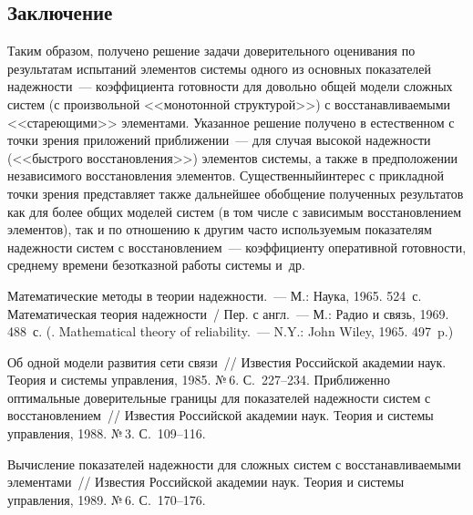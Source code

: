 \begin{multicols}{2}
\section{Заключение}

      Таким образом, получено решение задачи доверительного оценивания 
по результатам испытаний элементов системы одного из основных 
показателей надежности~--- коэффициента готовности для довольно общей 
модели сложных систем (с произвольной <<монотонной структурой>>) с 
восстанавливаемыми <<стареющими>> элементами. Указанное решение 
получено в естественном с точки зрения приложений приближении~--- для 
случая высокой надежности (<<быстрого восстановления>>) элементов 
системы, а также в предположении независимого восстановления элементов. 
Существенный\linebreak интерес с прикладной точки зрения представляет также 
дальнейшее обобщение полученных результатов как для более общих 
моделей систем (в том чис\-ле с зависимым восстановлением элементов), так и 
по отношению к другим часто используемым показателям надежности 
систем с восстановлением~--- коэффициенту оперативной готовности, 
среднему времени безотказной работы системы и~др.

{\small\frenchspacing
{%
\begin{thebibliography}{99}

 Математические 
методы в теории надежности.~--- М.: Наука, 1965. 524~с. 
 Математическая теория надежности~/ Пер. с 
англ.~--- М.: Радио и связь, 1969. 488~с. (. 
{Mathematical theory of reliability}.~--- N.Y.: John Wiley, 1965. 497~p.)

 Об одной модели развития сети связи~// Известия 
Российской академии наук. Теория и системы управления, 1985. №\,6. 
С.~227--234.
 Приближенно оптимальные доверительные границы 
для показателей надежности сис\-тем с восстановлением~// Известия 
Российской академии наук. Теория и системы управления, 1988. №\,3. 
С.~109--116.

 Вычисление показателей надежности для 
сложных систем с восстанавливаемыми элементами~// Известия 
Российской академии наук. Теория и системы управления, 1989. №\,6. 
С.~170--176.


\end{thebibliography}}}
\end{multicols}
